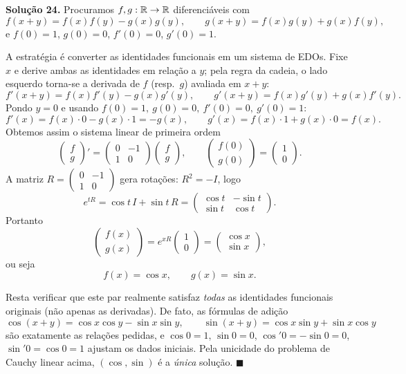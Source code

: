 \bigskip\noindent\textbf{Solução 24.}\quad
Procuramos $f,g:\mathbb{R}\to\mathbb{R}$ diferenciáveis com
\[
    f(x+y)=f(x)f(y)-g(x)g(y),\qquad
    g(x+y)=f(x)g(y)+g(x)f(y),
\]
e $f(0)=1$, $g(0)=0$, $f'(0)=0$, $g'(0)=1$.

A estratégia é converter as identidades funcionais em um sistema de EDOs. Fixe $x$ e derive ambas as identidades em relação a $y$; pela regra da cadeia, o lado esquerdo torna-se a derivada de $f$ (resp.\ $g$) avaliada em $x+y$:
\[
    f'(x+y)=f(x)f'(y)-g(x)g'(y),\qquad
    g'(x+y)=f(x)g'(y)+g(x)f'(y).
\]
Pondo $y=0$ e usando $f(0)=1,\ g(0)=0,\ f'(0)=0,\ g'(0)=1$:
\[
    f'(x)=f(x)\cdot0-g(x)\cdot1=-g(x),\qquad
    g'(x)=f(x)\cdot1+g(x)\cdot0=f(x).
\]
Obtemos assim o sistema linear de primeira ordem
\[
    \begin{pmatrix}f\\g\end{pmatrix}'
    =\begin{pmatrix}0&-1\\1&0\end{pmatrix}
     \begin{pmatrix}f\\g\end{pmatrix},
    \qquad
    \begin{pmatrix}f(0)\\g(0)\end{pmatrix}=\begin{pmatrix}1\\0\end{pmatrix}.
\]
A matriz $R=\begin{pmatrix}0&-1\\1&0\end{pmatrix}$ gera rotações: $R^2=-I$, logo
\[
    e^{tR}=\cos t\,I+\sin t\,R=\begin{pmatrix}\cos t&-\sin t\\ \sin t&\cos t\end{pmatrix}.
\]
Portanto
\[
    \begin{pmatrix}f(x)\\g(x)\end{pmatrix}
    =e^{xR}\begin{pmatrix}1\\0\end{pmatrix}
    =\begin{pmatrix}\cos x\\ \sin x\end{pmatrix},
\]
ou seja
\[
    \boxed{\,f(x)=\cos x,\qquad g(x)=\sin x.\,}
\]

Resta verificar que este par realmente satisfaz \emph{todas} as identidades funcionais originais (não apenas as derivadas). De fato, as fórmulas de adição
\[
    \cos(x+y)=\cos x\cos y-\sin x\sin y,\qquad
    \sin(x+y)=\cos x\sin y+\sin x\cos y
\]
são exatamente as relações pedidas, e $\cos0=1$, $\sin0=0$, $\cos'0=-\sin0=0$, $\sin'0=\cos0=1$ ajustam os dados iniciais. Pela unicidade do problema de Cauchy linear acima, $(\cos,\sin)$ é a \emph{única} solução. \qquad$\blacksquare$


